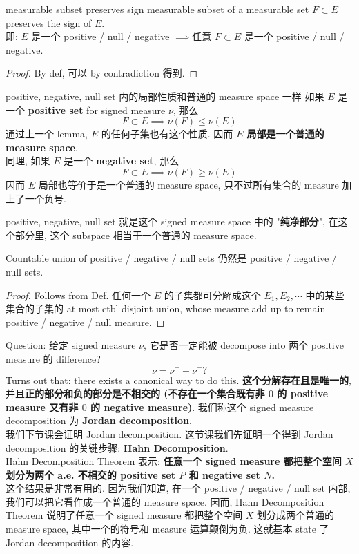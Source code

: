 \documentclass[lang=cn,11pt]{elegantbook}
\begin{document}
\begin{lemma}{measurable subset preserves sign}
measurable subset of a measurable set $F\subset E$ preserves the sign of $E$.\\
即: $E$ 是一个 positive / null / negative $\implies$任意 $F \subset E$ 是一个 positive / null / negative.
\end{lemma}
\begin{proof}
By def, 可以 by contradiction 得到.
\end{proof}


\begin{lemma}{positive, negative, null set 内的局部性质和普通的 measure space 一样}
如果 $E$ 是一个\textbf{ positive set} for signed measure $\nu$, 那么 \[
F \subset E \implies \nu (F) \leq \nu (E)
\]
通过上一个 lemma, $E$ 的任何子集也有这个性质. 因而 \textbf{$E$ 局部是一个普通的 measure space}. \\
同理, 如果 $E$  是一个\textbf{ negative set}, 那么 \[
F \subset E \implies \nu (F) \geq \nu (E)
\]
因而 $E$ 局部也等价于是一个普通的 measure space, 只不过所有集合的 measure 加上了一个负号.
\end{lemma}
\begin{remark}
    positive, negative, null set 就是这个 signed measure space 中的 "\textbf{纯净部分}", 在这个部分里, 这个 subspace 相当于一个普通的 measure space. 
\end{remark}



\begin{lemma}
    Countable union of positive / negative / null sets 仍然是 positive / negative / null sets.
\end{lemma}
\begin{proof}
    Follows from Def. 任何一个 $E$ 的子集都可分解成这个 $E_1, E_2,\cdots$ 中的某些集合的子集的 at most ctbl disjoint union, whose measure add up to remain positive / negative / null measure.
\end{proof}


Question:
给定 signed measure $\nu$, 它是否一定能被 decompose into 两个 positive measure 的 difference? \[
\nu  = \nu ^+ - \nu^- ?
\]
Turns out that: there exists a canonical way to do this. \textbf{这个分解存在且是唯一的}, 并且\textbf{正的部分和负的部分是不相交的 (不存在一个集合既有非 $0$ 的 positive measure 又有非 $0$ 的 negative measure)}. 我们称这个 signed measure decomposition 为\textbf{ Jordan decomposition}.\\
我们下节课会证明 Jordan decomposition. 这节课我们先证明一个得到 Jordan decomposition 的关键步骤: \textbf{Hahn Decomposition}. \\
Hahn Decomposition Theorem 表示: \textbf{任意一个 signed measure 都把整个空间 $X$ 划分为两个 a.e. 不相交的 positive set $P$ 和 negative set $N$.}\\
这个结果是非常有用的. 因为我们知道, 在一个 positive / negative / null set 内部, 我们可以把它看作成一个普通的 measure space. 因而, Hahn Decomposition Theorem 说明了任意一个 signed measure 都把整个空间 $X$ 划分成两个普通的 measure space, 其中一个的符号和 measure 运算颠倒为负. 这就基本 state 了 Jordan decomposition 的内容.
\end{document}
